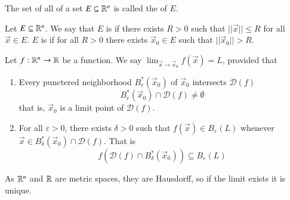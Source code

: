 \documentclass[12pt]{report}
\begin{document}
\begin{appendices}
    \begin{defn}{}{}
        The set of all  of a set $E \subseteq \mathbb R^n$ is called the  of $E$.
    \end{defn}

    \begin{defn}{}{}
        Let $E \subseteq \mathbb R^n$. We say that $E$ is  if there exists $R > 0$ such that $||\vec{x}|| \leq R$ for all $\vec{x} \in E$. $E$ is  if for all $R > 0$ there exists $\vec{x}_0 \in E$ such that $||\vec{x}_0|| > R$.
    \end{defn}


    \begin{defn}{}{}
        Let $f:\mathbb R^n\rightarrow \mathbb R$ be a function. We say $\lim_{\vec{x}\rightarrow \vec{x}_0}f(\vec{x}) = L$, provided that \begin{enumerate}
            \item Every punctered neighborhood $B_r^*(\vec{x}_0)$ of $\vec{x}_0$ intersects $\mathscr{D}(f)$ 
                \begin{equation}
                        B_r^*(\vec{x}_0) \cap \mathscr{D}(f) \neq \emptyset
                \end{equation}
                that is, $\vec{x}_0$ is a limit point of $\mathscr{D}(f)$.
            \item For all $\varepsilon > 0$, there exists $\delta > 0$ such that $f(\vec{x}) \in B_{\varepsilon}(L)$ whenever $\vec{x} \in B_{\delta}^*(\vec{x}_0) \cap \mathscr{D}(f)$. That is \begin{equation}
                    f(\mathscr{D}(f)\cap B_{\delta}^*(\vec{x}_0)) \subseteq B_{\varepsilon}(L)
            \end{equation}
        \end{enumerate}
    \end{defn}

    
    \begin{rmk}{}{}
        As $\mathbb R^n$ and $\mathbb R$ are metric spaces, they are Hausdorff, so if the limit exists it is unique.
    \end{rmk}



\end{appendices}
\end{document}
